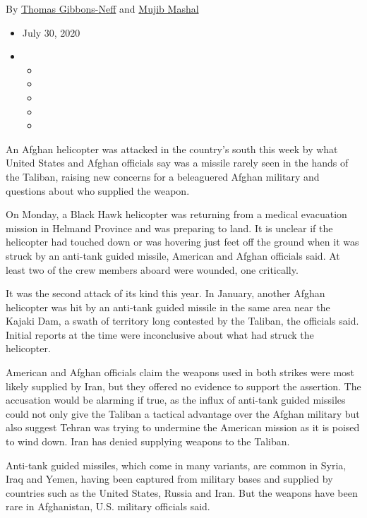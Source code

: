 By \href{https://www.nytimes.com/by/thomas-gibbons-neff}{Thomas
Gibbons-Neff} and \href{https://www.nytimes.com/by/mujib-mashal}{Mujib
Mashal}

\begin{itemize}
\item
  July 30, 2020
\item
  \begin{itemize}
  \item
  \item
  \item
  \item
  \item
  \end{itemize}
\end{itemize}

An Afghan helicopter was attacked in the country's south this week by
what United States and Afghan officials say was a missile rarely seen in
the hands of the Taliban, raising new concerns for a beleaguered Afghan
military and questions about who supplied the weapon.

On Monday, a Black Hawk helicopter was returning from a medical
evacuation mission in Helmand Province and was preparing to land. It is
unclear if the helicopter had touched down or was hovering just feet off
the ground when it was struck by an anti-tank guided missile, American
and Afghan officials said. At least two of the crew members aboard were
wounded, one critically.

It was the second attack of its kind this year. In January, another
Afghan helicopter was hit by an anti-tank guided missile in the same
area near the Kajaki Dam, a swath of territory long contested by the
Taliban, the officials said. Initial reports at the time were
inconclusive about what had struck the helicopter.

American and Afghan officials claim the weapons used in both strikes
were most likely supplied by Iran, but they offered no evidence to
support the assertion. The accusation would be alarming if true, as the
influx of anti-tank guided missiles could not only give the Taliban a
tactical advantage over the Afghan military but also suggest Tehran was
trying to undermine the American mission as it is poised to wind down.
Iran has denied supplying weapons to the Taliban.

Anti-tank guided missiles, which come in many variants, are common in
Syria, Iraq and Yemen, having been captured from military bases and
supplied by countries such as the United States, Russia and Iran. But
the weapons have been rare in Afghanistan, U.S. military officials said.

